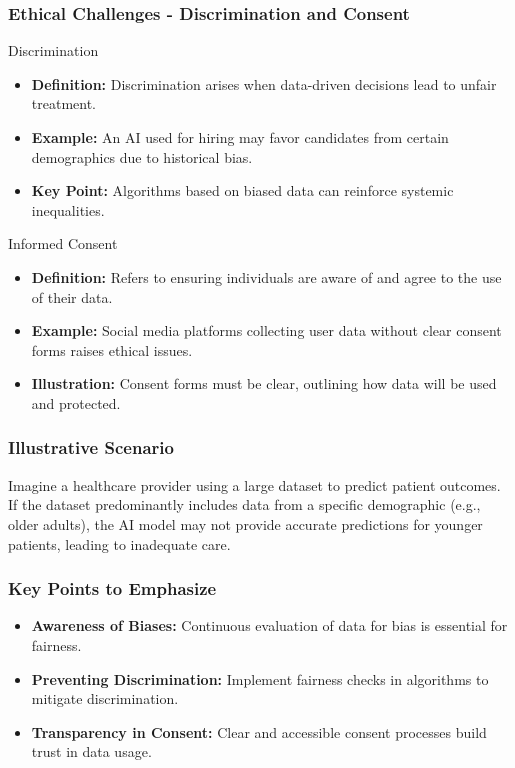 \documentclass[aspectratio=169]{beamer}
\begin{document}
\begin{frame}[fragile]
    \frametitle{Ethical Challenges - Discrimination and Consent}
    \begin{block}{Discrimination}
        \begin{itemize}
            \item \textbf{Definition:} Discrimination arises when data-driven decisions lead to unfair treatment.
            \item \textbf{Example:} An AI used for hiring may favor candidates from certain demographics 
            due to historical bias.
            \item \textbf{Key Point:} Algorithms based on biased data can reinforce systemic inequalities.
        \end{itemize}
    \end{block}
    
    \begin{block}{Informed Consent}
        \begin{itemize}
            \item \textbf{Definition:} Refers to ensuring individuals are aware of and agree to the use 
            of their data.
            \item \textbf{Example:} Social media platforms collecting user data without clear consent forms 
            raises ethical issues.
            \item \textbf{Illustration:} Consent forms must be clear, outlining how data will be used and protected.
        \end{itemize}
    \end{block}
\end{frame}

\begin{frame}[fragile]
    \frametitle{Illustrative Scenario}
    Imagine a healthcare provider using a large dataset to predict patient outcomes. 
    If the dataset predominantly includes data from a specific demographic (e.g., older adults), 
    the AI model may not provide accurate predictions for younger patients, leading to inadequate care.
\end{frame}

\begin{frame}[fragile]
    \frametitle{Key Points to Emphasize}
    \begin{itemize}
        \item \textbf{Awareness of Biases:} Continuous evaluation of data for bias is essential for fairness.
        \item \textbf{Preventing Discrimination:} Implement fairness checks in algorithms to mitigate discrimination.
        \item \textbf{Transparency in Consent:} Clear and accessible consent processes build trust in data usage.
    \end{itemize}
\end{frame}
\end{document}
